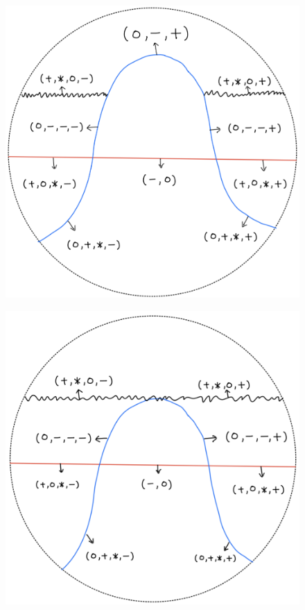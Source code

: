 \begin{definition}
\begin{enumerate}
\begin{itemize}
\begin{figure}[H]
    \centering
    \includegraphics[scale = 0.95]{diagrams/lemma2/12.png} 
    \caption{}
    \label{fig:your-label}
\end{figure}
\begin{figure}[H]
    \centering
    \includegraphics[scale = 0.95]{diagrams/lemma2/13.png} 

\end{figure}
\end{itemize}
\end{enumerate}
\end{definition}
